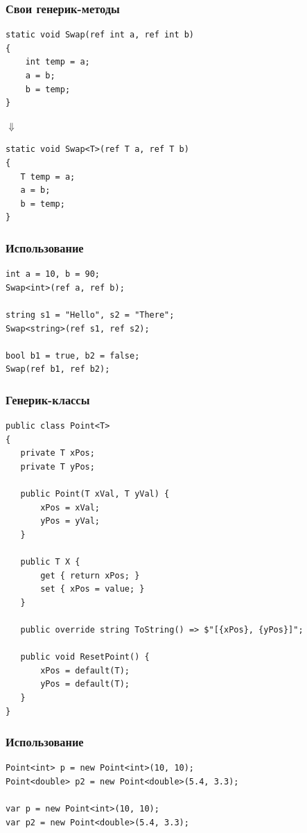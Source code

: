 \documentclass[xetex,mathserif,serif]{beamer}
\begin{document}
    \begin{frame}[fragile]
        \frametitle{Свои генерик-методы}
        \begin{verbatim}
static void Swap(ref int a, ref int b)
{
    int temp = a;
    a = b;
    b = temp;
}
        \end{verbatim}
        \hspace{2cm} $\Downarrow$
        \begin{verbatim}
static void Swap<T>(ref T a, ref T b)
{
   T temp = a;
   a = b;
   b = temp;
}
        \end{verbatim}
    \end{frame}

    \begin{frame}[fragile]
        \frametitle{Использование}
        \begin{verbatim}
int a = 10, b = 90;
Swap<int>(ref a, ref b);

string s1 = "Hello", s2 = "There";
Swap<string>(ref s1, ref s2);

bool b1 = true, b2 = false;
Swap(ref b1, ref b2);
        \end{verbatim}
    \end{frame}

    \begin{frame}[fragile]
        \frametitle{Генерик-классы}
        \begin{scriptsize}
            \begin{verbatim}
public class Point<T>
{
   private T xPos;
   private T yPos;

   public Point(T xVal, T yVal) {
       xPos = xVal;
       yPos = yVal;
   }
   
   public T X {
       get { return xPos; }
       set { xPos = value; }
   }

   public override string ToString() => $"[{xPos}, {yPos}]";

   public void ResetPoint() {
       xPos = default(T);
       yPos = default(T);
   }
}
            \end{verbatim}
        \end{scriptsize}
    \end{frame}

    \begin{frame}[fragile]
        \frametitle{Использование}
        \begin{verbatim}
Point<int> p = new Point<int>(10, 10);
Point<double> p2 = new Point<double>(5.4, 3.3);

var p = new Point<int>(10, 10);
var p2 = new Point<double>(5.4, 3.3);
        \end{verbatim}
    \end{frame}
\end{document}
